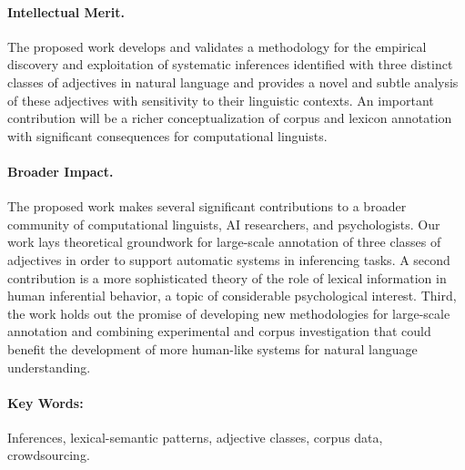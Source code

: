 \documentclass[10pt]{article}
\begin{document}
\vspace{-1.2em}
\paragraph{Intellectual Merit.} The proposed work 
develops and validates a methodology for the empirical discovery and exploitation of systematic inferences identified with three distinct classes of adjectives in natural language
and provides a novel and subtle analysis of these adjectives with sensitivity to their linguistic contexts. An important contribution will be a richer conceptualization 
of corpus and lexicon annotation with significant consequences for computational linguists. 

\vspace{-1.2em}
\paragraph{Broader Impact.}
The proposed work  makes several significant contributions to a broader community of computational linguists, AI researchers, and psychologists. 
Our work lays theoretical groundwork for large-scale annotation of three classes of adjectives in order to support automatic systems in inferencing tasks. 
A second contribution is a more sophisticated theory of the role of lexical information in human inferential behavior, a topic of considerable psychological interest.
Third, the work holds out the promise of developing new methodologies for large-scale annotation and combining experimental and corpus investigation that could benefit the development of more human-like systems for natural language understanding.


\vspace{-1.2em}


\paragraph{Key Words:} Inferences, lexical-semantic patterns, adjective classes, corpus data, crowdsourcing. 
\end{document}
